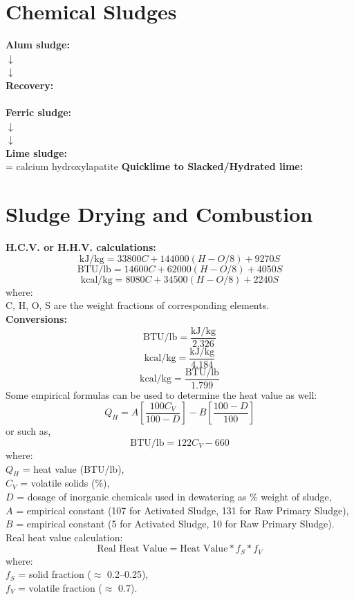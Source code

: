 \documentclass[a4paper, landscape, 8pt]{extarticle}
\begin{document}
\begin{multicols}{4}
\section*{Chemical Sludges}
\textbf{Alum sludge:}\\
 $\downarrow$\\
 $\downarrow$\\
\textbf{Recovery:}\\
\\
\textbf{Ferric sludge:}\\
 $\downarrow$\\
 $\downarrow$\\
\textbf{Lime sludge:}\\
 = calcium hydroxylapatite
\textbf{Quicklime to Slacked/Hydrated lime:}
\section*{Sludge Drying and Combustion} \label{Sludge_D_C}
\textbf{H.C.V. or H.H.V. calculations:}
\[
\text{kJ/kg} = 33800 C + 144000 (H - O/8) + 9270 S
\]
\[
\text{BTU/lb} = 14600 C + 62000 (H - O/8) + 4050 S
\]
\[
\text{kcal/kg} = 8080 C + 34500 (H - O/8) + 2240 S
\]
where:\\
C, H, O, S are the weight fractions of corresponding elements.\\
\textbf{Conversions:}
\[
\text{BTU/lb} = \frac{\text{kJ/kg}}{2.326}
\]
\[
\text{kcal/kg} = \frac{\text{kJ/kg}}{4.184}
\]
\[
\text{kcal/kg} = \frac{\text{BTU/lb}}{1.799}
\]
Some empirical formulas can be used to determine the heat value as well:
\[
Q_H = A\left[\frac{100C_V}{100-D}\right] - B\left[\frac{100-D}{100}\right]
\]
or such as,
\[
\text{BTU/lb} = 122C_V - 660
\]
where:\\
$Q_H$ = heat value (BTU/lb),\\
$C_V$ = volatile solids (\%),\\
$D$ = dosage of inorganic chemicals used in dewatering as \% weight of sludge,\\
$A$ = empirical constant (107 for Activated Sludge, 131 for Raw Primary Sludge),\\
$B$ = empirical constant (5 for Activated Sludge, 10 for Raw Primary Sludge).\\
Real heat value calculation:
\[
\text{Real Heat Value} = \text{Heat Value} * f_S * f_V
\]
where:\\
$f_S$ = solid fraction ($\approx$ 0.2--0.25),\\
$f_V$ = volatile fraction ($\approx$ 0.7).

\end{multicols}
\end{document}
